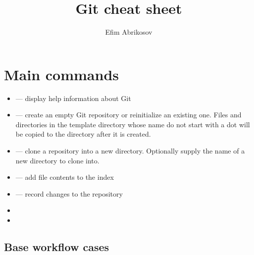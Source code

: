 \documentclass[12pt]{article}
\begin{document}
\title{Git cheat sheet}
\author{Efim Abrikosov}
\maketitle


\section{Main commands}
\begin{itemize}
  \item {} --- display help information about Git
  \item {} --- create an empty Git repository or reinitialize an existing one. Files and directories in the template directory whose name do not start with a dot will be copied to the directory after it is created.
  \item {} --- clone a repository into a new directory. Optionally supply the name of a new directory to clone into.
  \item {} --- add file contents to the index
  \item {} --- record changes to the repository
  \item {}
  \item {}
\end{itemize}




\subsection{Base workflow cases}
\end{document}
